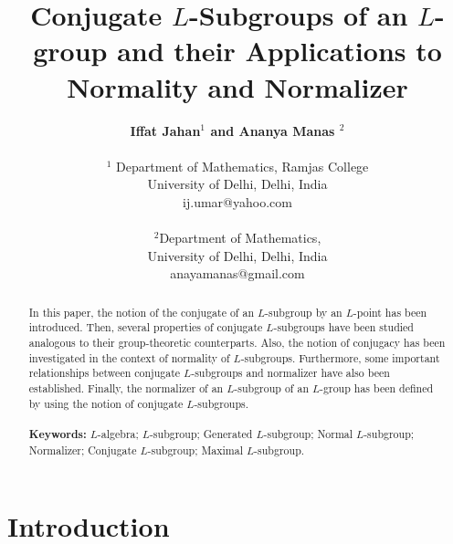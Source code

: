 \documentclass[10pt]{article}
\date{}
\theoremstyle{plain}
\theoremstyle{definition}
\theoremstyle{remark}
\theoremstyle{case}
\begin{document}
\title{\bf {Conjugate $L$-Subgroups of an $L$-group and their Applications to Normality and Normalizer}}
\author{\textbf{Iffat Jahan$^1$ and Ananya Manas $^2$} \\\\ 
	$^{1}$
	Department of Mathematics, Ramjas College\\
	University of Delhi, Delhi, India \\
	ij.umar@yahoo.com \\\\
	$^{2}$Department of Mathematics, \\
	University of Delhi, Delhi, India \\
	anayamanas@gmail.com 
	\\    }
\date{}
\maketitle

\begin{abstract}
	In this paper, the notion of the conjugate of an $L$-subgroup by an $L$-point has been introduced. Then, several properties of conjugate $L$-subgroups have been studied analogous to their group-theoretic counterparts. Also, the notion of conjugacy has been investigated in the context of normality of $L$-subgroups. Furthermore, some important relationships between conjugate $L$-subgroups and normalizer have also been established. Finally, the normalizer of an $L$-subgroup of an $L$-group has been defined by using the notion of  conjugate $L$-subgroups. \\\\
	{\bf Keywords:} $L$-algebra; $L$-subgroup; Generated $L$-subgroup; Normal $L$-subgroup; Normalizer; Conjugate $L$-subgroup; Maximal $L$-subgroup.
	
\end{abstract}

\section{Introduction}
\end{document}
